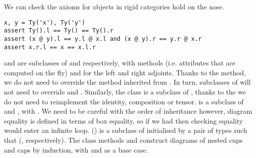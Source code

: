 \begin{example}
We can check the axioms for objects in rigid categories hold on the nose.

\begin{verbatim}
x, y = Ty('x'), Ty('y')
assert Ty().l == Ty() == Ty().r
assert (x @ y).l == y.l @ x.l and (x @ y).r == y.r @ x.r
assert x.r.l == x == x.l.r
\end{verbatim}
\end{example}

 and  are subclasses of  and  respectively, with  methods (i.e. attributes that are computed on the fly)  and  for the left and right adjoints.
Thanks to the  method, we do not need to override the  method inherited from .
In turn, subclasses of  will not need to override  and .
Similarly, the  class is a subclass of , thanks to the  we do not need to reimplement the identity, composition or tensor.
 is a subclass of  and , with .
We need to be careful with the order of inheritance however, diagram equality is defined in terms of box equality, so if we had  then checking equality would enter an infinite loop.
 () is a subclass of  initialised by a pair of types  such that   (, respectively).
The class methods  and  construct diagrams of nested cups and caps by induction, with  and  as a base case.

